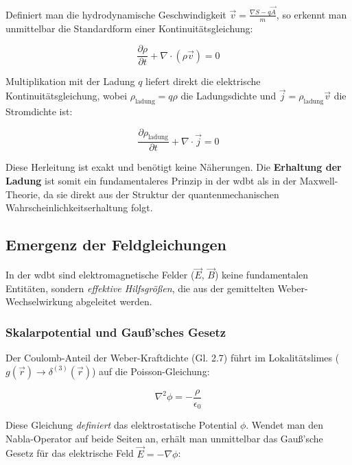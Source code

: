 Definiert man die hydrodynamische Geschwindigkeit $\vec{v} = \frac{\nabla S - q\vec{A}}{m}$, so erkennt man unmittelbar die Standardform einer Kontinuitätsgleichung:

\begin{equation}
    \frac{\partial \rho}{\partial t} + \nabla \cdot (\rho \vec{v}) = 0
\end{equation}

Multiplikation mit der Ladung $q$ liefert direkt die elektrische Kontinuitätsgleichung, wobei $\rho_{\text{ladung}} = q\rho$ die Ladungsdichte und $\vec{j} = \rho_{\text{ladung}} \vec{v}$ die Stromdichte ist:

\begin{equation}
    \frac{\partial \rho_{\text{ladung}}}{\partial t} + \nabla \cdot \vec{j} = 0
\end{equation}

Diese Herleitung ist exakt und benötigt keine Näherungen. Die \textbf{Erhaltung der Ladung} ist somit ein fundamentaleres Prinzip in der \gls{wdbt} als in der Maxwell-Theorie, da sie direkt aus der
Struktur der quantenmechanischen Wahrscheinlichkeitserhaltung folgt.

\subsection{Emergenz der Feldgleichungen}

In der \gls{wdbt} sind elektromagnetische Felder ($\vec{E}$, $\vec{B}$) keine fundamentalen Entitäten, sondern \textit{effektive Hilfsgrößen}, die aus der gemittelten Weber-Wechselwirkung abgeleitet
werden.

\subsubsection{Skalarpotential und Gauß'sches Gesetz}

Der Coulomb-Anteil der Weber-Kraftdichte (Gl. 2.7) führt im Lokalitätslimes ($g(\vec{r}) \rightarrow \delta^{(3)}(\vec{r})$)
 auf die Poisson-Gleichung:

\begin{equation}
    \nabla^2 \phi = -\frac{\rho}{\epsilon_0}
\end{equation}

Diese Gleichung \textit{definiert} das elektrostatische Potential $\phi$. Wendet man den Nabla-Operator auf beide Seiten an, erhält man unmittelbar das Gauß'sche Gesetz für das elektrische Feld $\vec{E} = -\nabla \phi$:

